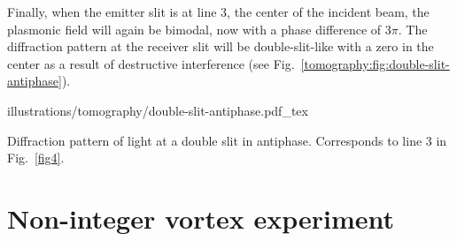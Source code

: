 Finally, when the emitter slit is at line 3, the center of the incident beam, the plasmonic field will again be bimodal, now with a phase difference of $3\pi$. The diffraction pattern at the receiver slit will be double-slit-like with a zero in the center as a result of destructive interference (see Fig.~\ref{tomography:fig:double-slit-antiphase}).
%
\begin{marginfigure}
\centering
{illustrations/tomography/double-slit-antiphase.pdf_tex}
\caption{Diffraction pattern of light at a double slit in antiphase.
Corresponds to line 3 in Fig.~\ref{fig4}.}
\label{tomography:fig:double-slit-antiphase}
\end{marginfigure}

\section{Non-integer vortex experiment}


